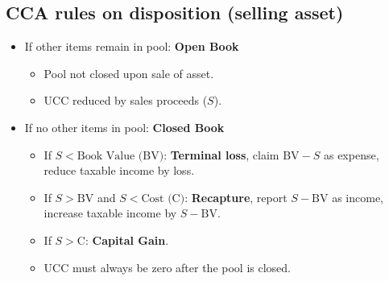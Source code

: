 \subsection{CCA rules on disposition (selling asset)}
\begin{definition}
    \begin{itemize}
        \item If other items remain in pool: \textbf{Open Book}
        \begin{itemize}
            \item Pool not closed upon sale of asset.
            \item UCC reduced by sales proceeds (\( S \)). %
        \end{itemize}
        \item If no other items in pool: \textbf{Closed Book}
        \begin{itemize}
            \item If \( S < \text{Book Value (BV)} \): \textbf{Terminal loss}, claim \( \text{BV} - S \) as expense, reduce taxable income by loss.
            \item If \( S > \text{BV} \) and \( S < \text{Cost (C)} \): \textbf{Recapture}, report \( S - \text{BV} \) as income, increase taxable income by \( S - \text{BV} \).
            \item If \( S > \text{C} \): \textbf{Capital Gain}.
            \item UCC must always be zero after the pool is closed. %
        \end{itemize}
    \end{itemize}
\end{definition}

